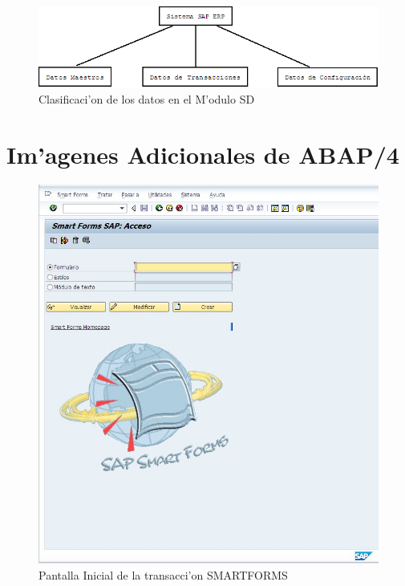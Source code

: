 \begin{figure}[htb]
\centering
\includegraphics[scale=0.45,type=png,ext=.png,read=.png]{figures/Clasificacion1}
\caption{Clasificaci'on de los datos en el M'odulo SD}
\label{fig:datasd}
\end{figure}

\section{Im'agenes Adicionales de ABAP/4}
\begin{figure}[H]
\centering
\includegraphics[scale=0.65,type=jpg,ext=.jpg,read=.jpg]{figures/sm_initial}
\caption{Pantalla Inicial de la transacci'on SMARTFORMS}
\label{fig:smartforms1}
\end{figure}

